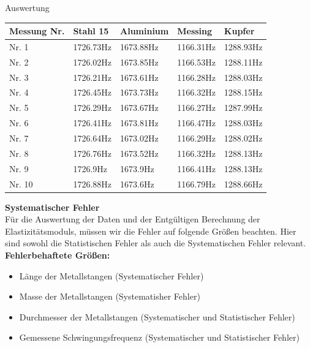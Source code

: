 \documentclass[twoside]{protokoll}
\begin{document}
\begin{aufgabe}{Auswertung}
 \begin{table}[H]
        \centering
        \begin{tabularx}{1.00\textwidth}{X X X X X} %
            \toprule
            \textbf{Messung Nr.} & \textbf{Stahl 15} & \textbf{Aluminium} & \textbf{Messing} & \textbf{Kupfer} \\
            \midrule
                Nr. 1 & 1726.73Hz & 1673.88Hz & 1166.31Hz & 1288.93Hz \\
                Nr. 2 & 1726.02Hz & 1673.85Hz & 1166.53Hz & 1288.11Hz \\
                Nr. 3 & 1726.21Hz & 1673.61Hz & 1166.28Hz & 1288.03Hz \\
                Nr. 4 & 1726.45Hz & 1673.73Hz & 1166.32Hz & 1288.15Hz \\
                Nr. 5 & 1726.29Hz & 1673.67Hz & 1166.27Hz & 1287.99Hz \\
                Nr. 6 & 1726.41Hz & 1673.81Hz & 1166.47Hz & 1288.03Hz \\
                Nr. 7 & 1726.64Hz & 1673.02Hz & 1166.29Hz & 1288.02Hz \\
                Nr. 8 & 1726.76Hz & 1673.52Hz & 1166.32Hz & 1288.13Hz \\
                Nr. 9 & 1726.9Hz & 1673.9Hz & 1166.41Hz & 1288.13Hz \\
                Nr. 10 & 1726.88Hz & 1673.6Hz & 1166.79Hz & 1288.66Hz \\
            \bottomrule
        \end{tabularx}
        \label{tab:mytable}
    \end{table}
\textbf{Systematischer Fehler}\\

Für die Auswertung der Daten und der Entgültigen Berechnung der Elastizitätsmoduls, müssen wir die Fehler 
auf folgende Größen beachten. 
Hier sind sowohl die Statistischen Fehler als auch die Systematischen Fehler relevant.\\


\textbf{Fehlerbehaftete Größen:}
\begin{itemize}
\item Länge der Metallstangen (Systematischer Fehler)
\item Masse der Metallstangen (Systematisher Fehler)
\item Durchmesser der Metallstangen (Systematischer und Statistischer Fehler)
\item Gemessene Schwingungsfrequenz (Systematischer und Statistischer Fehler)
\end{itemize}


\end{aufgabe}
\end{document}
